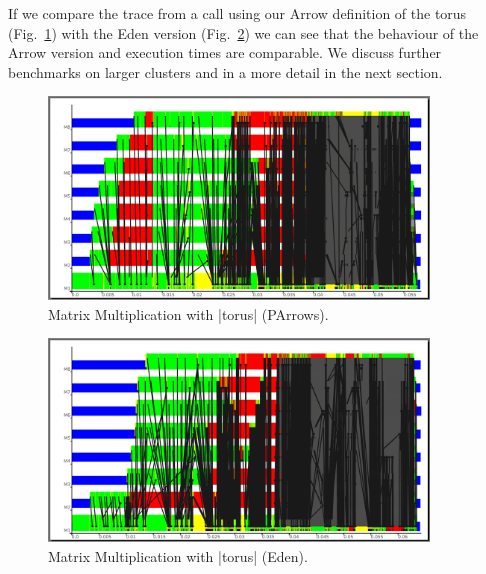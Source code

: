 If we compare the trace from a call using our Arrow definition of the torus (Fig.~\ref{fig:torus_parrows_trace}) with the Eden version (Fig.~\ref{fig:torus_eden_trace}) we can see that the behaviour of the Arrow version and execution times are comparable. We discuss further benchmarks on larger clusters and in a more detail in the next section.
\begin{figure}[tb]
	\centering
	\includegraphics[width=0.9\textwidth]{images/torus_matrix_parrows_scale}
	\caption[Matrix multiplication with |torus| (PArrows)]{Matrix Multiplication with |torus| (PArrows).}
	\label{fig:torus_parrows_trace}
\end{figure}

\begin{figure}[tb]
	\centering
	\includegraphics[width=0.9\textwidth]{images/torus_matrix_eden_scale}
	\caption[Matrix multiplication with |torus| (Eden)]{Matrix Multiplication with |torus| (Eden).}
	\label{fig:torus_eden_trace}
\end{figure}


